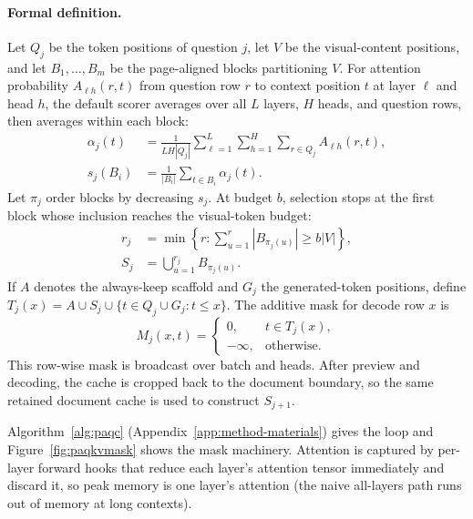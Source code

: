 \documentclass[letterpaper]{article} %
\begin{document}
\paragraph{Formal definition.}
Let $Q_j$ be the token positions of question $j$, let $V$ be the visual-content positions, and let $B_1,\ldots,B_m$ be the page-aligned blocks partitioning $V$. For attention probability $A_{\ell h}(r,t)$ from question row $r$ to context position $t$ at layer $\ell$ and head $h$, the default scorer averages over all $L$ layers, $H$ heads, and question rows, then averages within each block:
\begin{equation}
\begin{aligned}
\alpha_j(t)&=\frac{1}{LH|Q_j|}\sum_{\ell=1}^{L}\sum_{h=1}^{H}
                  \sum_{r\in Q_j}A_{\ell h}(r,t),\\
s_j(B_i)&=\frac{1}{|B_i|}\sum_{t\in B_i}\alpha_j(t).
\end{aligned}
\label{eq:block-score}
\end{equation}
Let $\pi_j$ order blocks by decreasing $s_j$. At budget $b$, selection stops at the first block whose inclusion reaches the visual-token budget:
\begin{equation}
\begin{aligned}
r_j&=\min\left\{r:\sum_{u=1}^{r}|B_{\pi_j(u)}|\geq b|V|\right\},\\
S_j&=\bigcup_{u=1}^{r_j}B_{\pi_j(u)}.
\end{aligned}
\label{eq:block-select}
\end{equation}
If $A$ denotes the always-keep scaffold and $G_j$ the generated-token positions, define $T_j(x)=A\cup S_j\cup\{t\in Q_j\cup G_j:t\leq x\}$. The additive mask for decode row $x$ is
\begin{equation}
M_j(x,t)=
\begin{cases}
0, & t\in T_j(x),\\
-\infty, & \text{otherwise}.
\end{cases}
\label{eq:restricted-mask}
\end{equation}
This row-wise mask is broadcast over batch and heads. After preview and decoding, the cache is cropped back to the document boundary, so the same retained document cache is used to construct $S_{j+1}$.

Algorithm~\ref{alg:paqc} (Appendix~\ref{app:method-materials}) gives the loop and Figure~\ref{fig:paqkvmask} shows the mask machinery. Attention is captured by per-layer forward hooks that reduce each layer's attention tensor immediately and discard it, so peak memory is one layer's attention (the naive all-layers path runs out of memory at long contexts).
\end{document}
